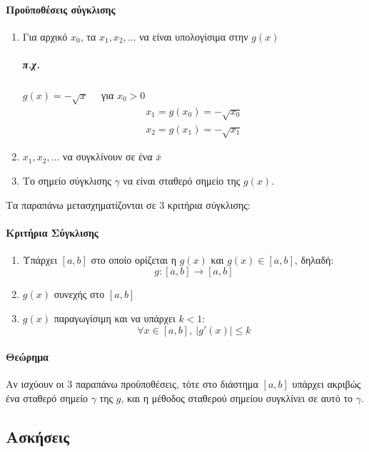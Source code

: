 \documentclass[11pt,a4paper,notitlepage,fleqn,final]{article}
\begin{document}
	\paragraph{Προϋποθέσεις σύγκλισης}
	\begin{enumerate}
		\item Για αρχικό \( x_0 \), τα \( x_1,x_2,\dots \) να
		είναι υπολογίσιμα στην \( g(x) \)
		\subparagraph{π.χ.}
		\( g(x) = -\sqrt{x} \quad \) για \( x_0 > 0 \)
		\begin{gather*}
			x_1 = g(x_0) = -\sqrt{x_0} \\
			x_2 = g(x_1) = -\sqrt{x_1}
		\end{gather*}
		\item \( x_1,x_2,\dots  \) να συγκλίνουν σε ένα
		\( \bar x \)
		\item Το σημείο σύγκλισης \( \gamma \) να είναι σταθερό
		σημείο της \( g(x) \).
	\end{enumerate}

	Τα παραπάνω μετασχηματίζονται σε 3 κριτήρια σύγκλισης:
	\paragraph{Κριτήρια Σύγκλισης}
	\begin{enumerate}
		\item Υπάρχει \( [a,b] \) στο οποίο ορίζεται η
		\( g(x) \) και \( g(x) \in [a,b] \), δηλαδή:
		\[
		g: [a,b] \to [a,b]
		\]
		\item \( g(x) \) συνεχής στο \( [a,b] \)
		\item \( g(x) \) παραγωγίσιμη και να υπάρχει \(k<1\):
		\[
		\forall x \in [a,b], \
		\left|g'(x)\right| \leq k
		\]
	\end{enumerate}

	\paragraph{Θεώρημα}
	Αν ισχύουν οι 3 παραπάνω προϋποθέσεις, τότε στο διάστημα
	\( [a,b] \) υπάρχει ακριβώς ένα σταθερό σημείο \(\gamma\)
	της \(g\), και η μέθοδος σταθερού σημείου συγκλίνει σε αυτό
	το \( \gamma \).

	\subsection{Ασκήσεις}
\end{document}
